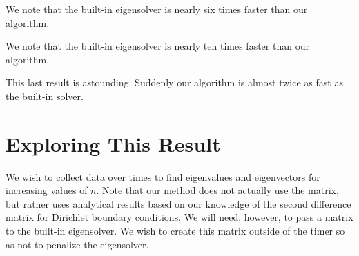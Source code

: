 \documentclass[12pt,]{book}
\newenvironment{Shaded}{}{}
\newcommand{\DecValTok}[1]{\textcolor[rgb]{0.25,0.63,0.44}{{#1}}}
\newcommand{\FloatTok}[1]{\textcolor[rgb]{0.25,0.63,0.44}{{#1}}}
\newcommand{\StringTok}[1]{\textcolor[rgb]{0.25,0.44,0.63}{{#1}}}
\newcommand{\CommentTok}[1]{\textcolor[rgb]{0.38,0.63,0.69}{\textit{{#1}}}}
\newcommand{\OperatorTok}[1]{\textcolor[rgb]{0.40,0.40,0.40}{{#1}}}
\newcommand{\NormalTok}[1]{{#1}}
\begin{document}
We note that the built-in eigensolver is nearly six times faster than
our algorithm.

\begin{Shaded}
\end{Shaded}

We note that the built-in eigensolver is nearly ten times faster than
our algorithm.

\begin{Shaded}
\end{Shaded}

This last result is astounding. Suddenly our algorithm is almost twice
as fast as the built-in solver.

\vfill

\pagebreak

\section{Exploring This Result}\label{exploring-this-result}

We wish to collect data over times to find eigenvalues and eigenvectors
for increasing values of \(n\). Note that our method does not actually
use the matrix, but rather uses analytical results based on our
knowledge of the second difference matrix for Dirichlet boundary
conditions. We will need, however, to pass a matrix to the built-in
eigensolver. We wish to create this matrix outside of the timer so as
not to penalize the eigensolver.
\end{document}
